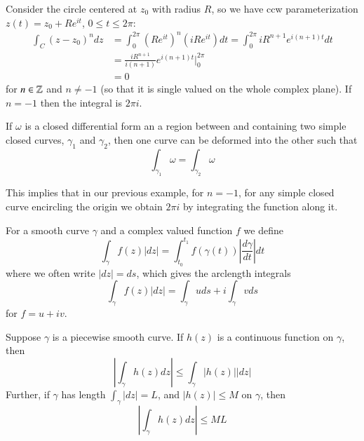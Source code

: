 \begin{example}
    Consider the circle centered at $z_0$ with radius $R$, so we have ccw parameterization $z(t) = z_0 + Re^{it}$, $0 \leq t \leq 2\pi$: \begin{align*}
        \int_C(z-z_0)^ndz &= \int_{0}^{2\pi}(Re^{it})^n(iRe^{it})dt = \int_{0}^{2\pi}iR^{n+1}e^{i(n+1)t}dt \\
        &= \frac{iR^{n+1}}{i(n+1)}e^{i(n+1)t}\Bigg\rvert_0^{2\pi} \\
        &= 0
    \end{align*}
    for $n \in \mathbb Z$ and $n \neq -1$ (so that it is single valued on the whole complex plane). If $n = -1$ then the integral is $2\pi i$. 
\end{example}


\begin{remark}
    If $\omega$ is a closed differential form an a region between and containing two simple closed curves, $\gamma_1$ and $\gamma_2$, then one curve can be deformed into the other such that \begin{equation*}
        \int_{\gamma_1}\omega = \int_{\gamma_2}\omega
    \end{equation*}
\end{remark}
This implies that in our previous example, for $n = -1$, for any simple closed curve encircling the origin we obtain $2\pi i$ by integrating the function along it.

\begin{definition}
    For a smooth curve $\gamma$ and a complex valued function $f$ we define \begin{equation*}
        \int_{\gamma}f(z)|dz| = \int_{t_0}^{t_1}f(\gamma(t))\left|\frac{d\gamma}{dt}\right|dt
    \end{equation*}
    where we often write $|dz| = ds$, which gives the arclength integrals \begin{equation*}
        \int_{\gamma}f(z)|dz| = \int_{\gamma}uds + i\int_{\gamma}vds
    \end{equation*}
    for $f = u+iv$.
\end{definition}



\begin{theorem}[ML Theorem]
    Suppose $\gamma$ is a piecewise smooth curve. If $h(z)$ is a continuous function on $\gamma$, then \begin{equation*}
        \left|\int_{\gamma}h(z)dz\right|\leq \int_{\gamma}|h(z)||dz|
    \end{equation*}
    Further, if $\gamma$ has length $\int_{\gamma}|dz| = L$, and $|h(z)| \leq M$ on $\gamma$, then \begin{equation*}
        \left|\int_{\gamma}h(z)dz\right| \leq ML
    \end{equation*}
\end{theorem}


